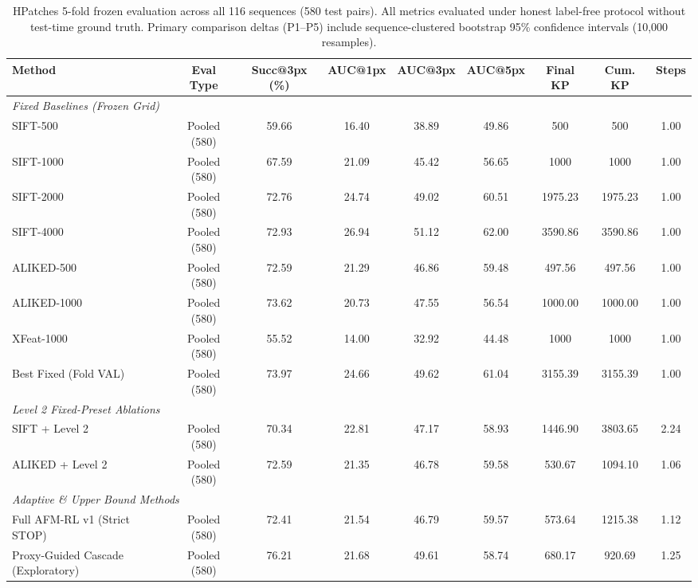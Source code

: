 \begin{table}[t]
\centering
\setlength{\tabcolsep}{3.5pt}
\caption{HPatches 5-fold frozen evaluation across all 116 sequences (580 test pairs). All metrics evaluated under honest label-free protocol without test-time ground truth. Primary comparison deltas (P1--P5) include sequence-clustered bootstrap 95\% confidence intervals (10,000 resamples).}
\label{tab:hpatches_main}
\small
\begin{tabular}{lcccccccc}
\hline
\textbf{Method} & \textbf{Eval Type} & \textbf{Succ@3px (\%)} & \textbf{AUC@1px} & \textbf{AUC@3px} & \textbf{AUC@5px} & \textbf{Final KP} & \textbf{Cum. KP} & \textbf{Steps} \\
\hline
\multicolumn{9}{l}{\textit{Fixed Baselines (Frozen Grid)}} \\
SIFT-500 & Pooled (580) & 59.66 & 16.40 & 38.89 & 49.86 & 500 & 500 & 1.00 \\
SIFT-1000 & Pooled (580) & 67.59 & 21.09 & 45.42 & 56.65 & 1000 & 1000 & 1.00 \\
SIFT-2000 & Pooled (580) & 72.76 & 24.74 & 49.02 & 60.51 & 1975.23 & 1975.23 & 1.00 \\
SIFT-4000 & Pooled (580) & 72.93 & 26.94 & 51.12 & 62.00 & 3590.86 & 3590.86 & 1.00 \\
ALIKED-500 & Pooled (580) & 72.59 & 21.29 & 46.86 & 59.48 & 497.56 & 497.56 & 1.00 \\
ALIKED-1000 & Pooled (580) & 73.62 & 20.73 & 47.55 & 56.54 & 1000.00 & 1000.00 & 1.00 \\
XFeat-1000 & Pooled (580) & 55.52 & 14.00 & 32.92 & 44.48 & 1000 & 1000 & 1.00 \\
Best Fixed (Fold VAL) & Pooled (580) & 73.97 & 24.66 & 49.62 & 61.04 & 3155.39 & 3155.39 & 1.00 \\
\hline
\multicolumn{9}{l}{\textit{Level 2 Fixed-Preset Ablations}} \\
SIFT + Level 2 & Pooled (580) & 70.34 & 22.81 & 47.17 & 58.93 & 1446.90 & 3803.65 & 2.24 \\
ALIKED + Level 2 & Pooled (580) & 72.59 & 21.35 & 46.78 & 59.58 & 530.67 & 1094.10 & 1.06 \\
\hline
\multicolumn{9}{l}{\textit{Adaptive \& Upper Bound Methods}} \\
Full AFM-RL v1 (Strict STOP) & Pooled (580) & 72.41 & 21.54 & 46.79 & 59.57 & 573.64 & 1215.38 & 1.12 \\
Proxy-Guided Cascade (Exploratory) & Pooled (580) & 76.21 & 21.68 & 49.61 & 58.74 & 680.17 & 920.69 & 1.25 \\

\end{tabular}
\end{table}
